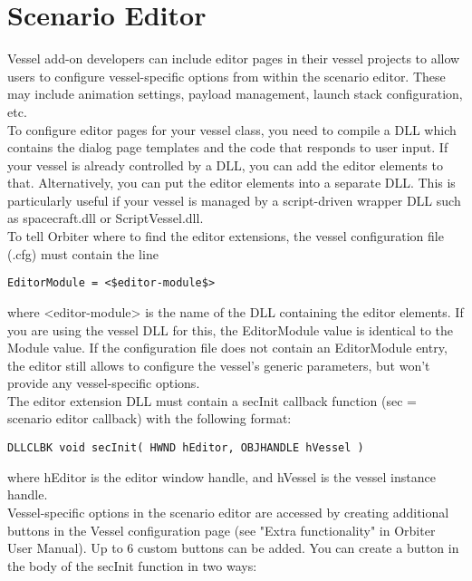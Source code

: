 \documentclass[Orbiter Developer Manual.tex]{subfiles}
\begin{document}
\section{Scenario Editor}
Vessel add-on developers can include editor pages in their vessel projects to allow users to configure vessel-specific options from within the scenario editor. These may include animation settings, payload management, launch stack configuration, etc.\\
To configure editor pages for your vessel class, you need to compile a DLL which contains the dialog page templates and the code that responds to user input. If your vessel is already controlled by a DLL, you can add the editor elements to that. Alternatively, you can put the editor elements into a separate DLL. This is particularly useful if your vessel is managed by a script-driven wrapper DLL such as spacecraft.dll or ScriptVessel.dll.\\
To tell Orbiter where to find the editor extensions, the vessel configuration file (.cfg) must contain the line

\begin{lstlisting}[language=OSFS,mathescape=true]
EditorModule = <$editor-module$>
\end{lstlisting}

\noindent
where <editor-module> is the name of the DLL containing the editor elements. If you are using the vessel DLL for this, the EditorModule value is identical to the Module value. If the configuration file does not contain an EditorModule entry, the editor still allows to configure the vessel's generic parameters, but won't provide any vessel-specific options.\\
The editor extension DLL must contain a secInit callback function (sec = scenario editor callback) with the following format:

\begin{lstlisting}
DLLCLBK void secInit( HWND hEditor, OBJHANDLE hVessel )
\end{lstlisting}

\noindent
where hEditor is the editor window handle, and hVessel is the vessel instance handle.\\
Vessel-specific options in the scenario editor are accessed by creating additional buttons in the Vessel configuration page (see "Extra functionality" in Orbiter User Manual). Up to 6 custom buttons can be added. You can create a button in the body of the secInit function in two ways:
\end{document}

